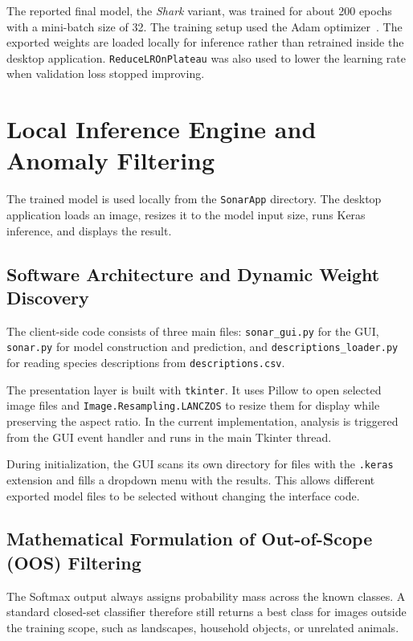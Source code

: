 \documentclass[11pt,a4paper,oneside]{article}
\begin{document}
The reported final model, the \textit{Shark} variant, was trained for about 200 epochs with a mini-batch size of 32. The training setup used the Adam optimizer~\cite{adam}. The exported weights are loaded locally for inference rather than retrained inside the desktop application. \texttt{ReduceLROnPlateau} was also used to lower the learning rate when validation loss stopped improving.

\section{Local Inference Engine and Anomaly Filtering}
\label{sec:inference}

The trained model is used locally from the \texttt{SonarApp} directory. The desktop application loads an image, resizes it to the model input size, runs Keras inference, and displays the result.

\subsection{Software Architecture and Dynamic Weight Discovery}
The client-side code consists of three main files: \texttt{sonar\_gui.py} for the GUI, \texttt{sonar.py} for model construction and prediction, and \texttt{descriptions\_loader.py} for reading species descriptions from \texttt{descriptions.csv}.

The presentation layer is built with \texttt{tkinter}. It uses Pillow to open selected image files and \texttt{Image.Resampling.LANCZOS} to resize them for display while preserving the aspect ratio. In the current implementation, analysis is triggered from the GUI event handler and runs in the main Tkinter thread.

During initialization, the GUI scans its own directory for files with the \texttt{.keras} extension and fills a dropdown menu with the results. This allows different exported model files to be selected without changing the interface code.

\subsection{Mathematical Formulation of Out-of-Scope (OOS) Filtering}
The Softmax output always assigns probability mass across the known classes. A standard closed-set classifier therefore still returns a best class for images outside the training scope, such as landscapes, household objects, or unrelated animals.
\end{document}
